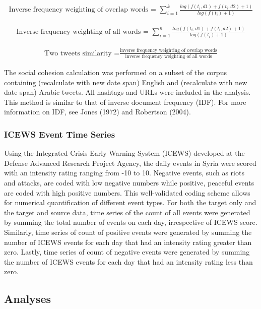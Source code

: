 \documentclass[english,man]{apa6}
\begin{document}
\begin{align}
\text{Inverse frequency weighting of overlap words = }\sum_{i=1}^k \frac{log(f(t_i, d1) + f(t_i, d2) + 1)}{log(f(t_i) + 1)}
\end{align}

\begin{align}
\text{Inverse frequency weighting of all words = }\sum_{i=1}^n \frac{log(f(t_i, d1) + f(t_i, d2) + 1)}{log(f(t_i) + 1)}
\end{align}

\begin{align}
\text{Two tweets similarity =}\frac{\text{inverse frequency weighting of overlap words}}{\text{inverse frequency weighting of all words}}
\end{align}

The social cohesion calculation was performed on a subset of the corpus containing (recalculate with new date span) English and (recalculate with new date span) Arabic tweets. All hashtags and URLs were included in the analysis. This method is similar to that of inverse document frequency (IDF). For more information on IDF, see Jones (1972) and Robertson (2004).

\hypertarget{icews-event-time-series}{%
\subsubsection{ICEWS Event Time Series}\label{icews-event-time-series}}

Using the Integrated Crisis Early Warning System (ICEWS) developed at the Defense Advanced Research Project Agency, the daily events in Syria were scored with an intensity rating ranging from -10 to 10. Negative events, such as riots and attacks, are coded with low negative numbers while positive, peaceful events are coded with high positive numbers. This well-validated coding scheme allows for numerical quantification of different event types.
For both the target only and the target and source data, time series of the count of all events were generated by summing the total number of events on each day, irrespective of ICEWS score. Similarly, time series of count of positive events were generated by summing the number of ICEWS events for each day that had an intensity rating greater than zero. Lastly, time series of count of negative events were generated by summing the number of ICEWS events for each day that had an intensity rating less than zero.

\hypertarget{analyses}{%
\subsection{Analyses}\label{analyses}}
\end{document}
